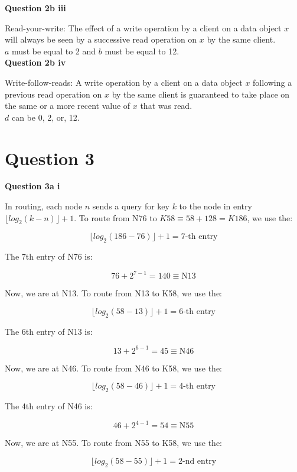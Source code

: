 \documentclass[11pt,a4paper]{report}
\begin{document}
\begin{multicols*}{2}
\noindent \textbf{Question 2b iii}

\noindent Read-your-write: The effect of a write operation by a client on a data object $x$ will always be seen by a successive read operation on $x$ by the same client.\\

\noindent $a$ must be equal to 2 and $b$ must be equal to 12.\\


\noindent \textbf{Question 2b iv}

\noindent Write-follow-reads: A write operation by a client on a data object $x$ following a previous read operation on $x$ by the same client is guaranteed to take place on the same or a more recent value of $x$ that was read.\\

\noindent $d$ can be 0, 2, or, 12.

\section{Question 3}

\noindent \textbf{Question 3a i}

\noindent In routing, each node $n$ sends a query for key $k$ to the node in entry $\lfloor log_2(k-n) \rfloor + 1$. To route from N76 to $K58 \equiv 58 + 128 = K186$, we use the:

$$\lfloor log_2(186-76) \rfloor + 1 = 7\text{-th entry}$$

\noindent The 7th entry of N76 is:

$$76 + 2^{7-1} = 140 \equiv \text{N13}$$

\noindent Now, we are at N13. To route from N13 to K58, we use the:

$$\lfloor log_2(58-13) \rfloor + 1 = 6\text{-th entry}$$

\noindent The 6th entry of N13 is:

$$13 + 2^{6-1} = 45 \equiv \text{N46}$$

\noindent Now, we are at N46. To route from N46 to K58, we use the:

$$\lfloor log_2(58-46) \rfloor + 1 = 4\text{-th entry}$$

\noindent The 4th entry of N46 is:

$$46 + 2^{4-1} = 54 \equiv \text{N55}$$

\noindent Now, we are at N55. To route from N55 to K58, we use the:

$$\lfloor log_2(58-55) \rfloor + 1 = 2\text{-nd entry}$$


\end{multicols*}
\end{document}
